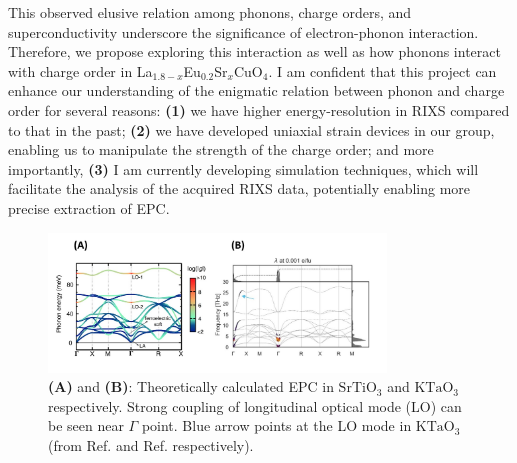 \documentclass[11pt]{article}
\begin{document}
This observed elusive relation among phonons, charge orders, and superconductivity underscore the significance of electron-phonon interaction. 
Therefore, we propose exploring this interaction as well as how phonons interact with charge order in {La$_{1.8-x}$Eu$_{0.2}$Sr$_x$CuO$_{4}$}. 
I am confident that this project can enhance our understanding of the enigmatic relation between phonon and charge order for several reasons: 
\textbf{(1)} we have higher energy-resolution in RIXS compared to that in the past; 
\textbf{(2)} we have developed uniaxial strain devices in our group, enabling us to manipulate the strength of the charge order; 
and more importantly, \textbf{(3)} I am currently developing simulation techniques, which will facilitate the analysis of the acquired RIXS data, potentially enabling more precise extraction of EPC.
\begin{figure}[!t]
    \centering
    \includegraphics[width=0.8\textwidth]{figures/new_second_figure.jpg}
    \caption{\textbf{(A)} and \textbf{(B)}: Theoretically calculated EPC in $\mathrm{SrTiO_3}$ and $\mathrm{KTaO_3}$ respectively. Strong coupling of longitudinal optical mode (LO) can be seen near $\Gamma$ point. Blue arrow points at the LO mode in  $\mathrm{KTaO_3}$ (from Ref.\cite{zhou_electron-phonon_2018} and Ref.\cite{esswein_first-principles_2023} respectively).}  
\end{figure}
\end{document}
